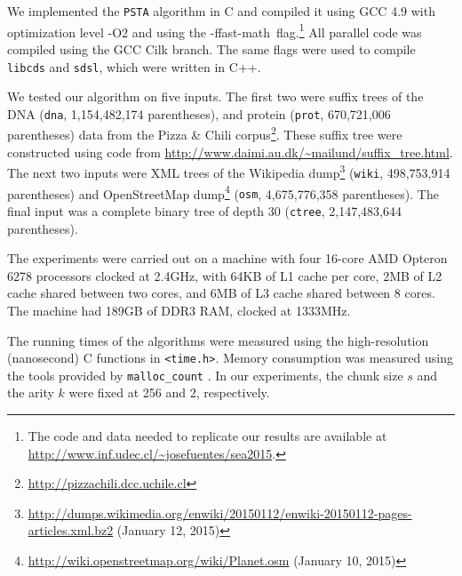 We implemented the {\tt PSTA} algorithm in C and compiled it using GCC 4.9 with
optimization level -O2 and using the \mbox{-ffast-math flag}.\footnote{The code
  and data needed to replicate our results are available at
  \url{http://www.inf.udec.cl/~josefuentes/sea2015}.}
All parallel code was compiled using the GCC Cilk branch.
The same flags were used to compile {\tt libcds} and {\tt sdsl}, which were
written in C++.

We tested our algorithm on five inputs.
The first two were suffix trees of the DNA ({\tt dna}, 1,154,482,174
parentheses), and protein ({\tt prot}, 670,721,006 parentheses) data from the
Pizza \& Chili corpus\footnote{\url{http://pizzachili.dcc.uchile.cl}}.
These suffix tree were constructed using code from
\url{http://www.daimi.au.dk/~mailund/suffix_tree.html}.
The next two inputs were XML trees of the Wikipedia
dump\footnote{\url{http://dumps.wikimedia.org/enwiki/20150112/enwiki-20150112-pages-articles.xml.bz2} (January 12, 2015)}
({\tt wiki}, 498,753,914 parentheses) and OpenStreetMap
dump\footnote{\url{http://wiki.openstreetmap.org/wiki/Planet.osm} (January 10,
  2015)} ({\tt osm}, 4,675,776,358 parentheses).
The final input was a complete binary tree of depth 30 ({\tt ctree},
2,147,483,644 parentheses).

The experiments were carried out on a machine with four 16-core AMD
Opteron\texttrademark{} 6278 processors clocked at 2.4GHz,
with 64KB of L1 cache per core, 2MB of L2 cache shared
between two cores, and 6MB of L3 cache shared between 8 cores.
The machine had 189GB of DDR3 RAM, clocked at 1333MHz.

The running times of the algorithms were measured using
the high-resolution (nanosecond) C functions in {\tt <time.h>}.
Memory consumption was measured using the tools provided by
{\tt malloc\_count} \cite{malloc-count}.
In our experiments, the chunk size $s$ and the arity $k$ were fixed at 256 and
2, respectively.
